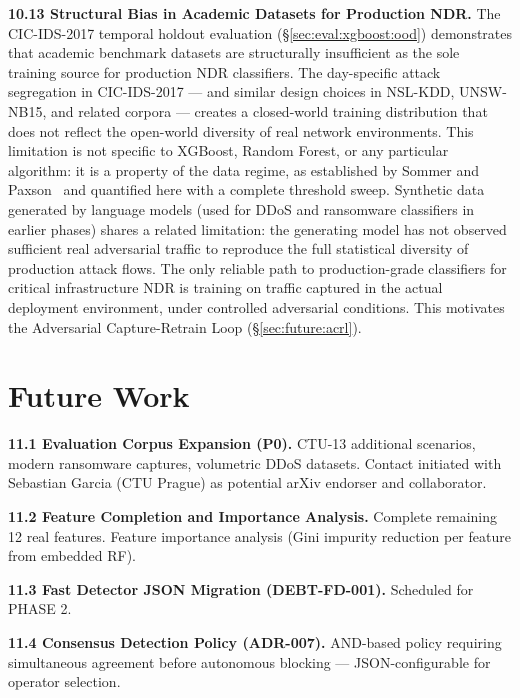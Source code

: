 \documentclass[11pt,a4paper]{article}
\begin{document}
    \textbf{10.13 Structural Bias in Academic Datasets for Production NDR.}
    The CIC-IDS-2017 temporal holdout evaluation (\S\ref{sec:eval:xgboost:ood}) demonstrates
    that academic benchmark datasets are structurally insufficient as the sole training source
    for production NDR classifiers. The day-specific attack segregation in CIC-IDS-2017 --- and
    similar design choices in NSL-KDD, UNSW-NB15, and related corpora --- creates a
    closed-world training distribution that does not reflect the open-world diversity of
    real network environments. This limitation is not specific to XGBoost, Random Forest,
    or any particular algorithm: it is a property of the data regime, as established by
    Sommer and Paxson~\cite{sommer2010} and quantified here with a complete threshold sweep.
    Synthetic data generated by language models (used for DDoS and ransomware classifiers
    in earlier phases) shares a related limitation: the generating model has not observed
    sufficient real adversarial traffic to reproduce the full statistical diversity of
    production attack flows.
    The only reliable path to production-grade classifiers for critical infrastructure
    NDR is training on traffic captured in the actual deployment environment, under
    controlled adversarial conditions. This motivates the Adversarial Capture-Retrain Loop
    (\S\ref{sec:future:acrl}).

    \section{Future Work}
    \label{sec:future}

    \textbf{11.1 Evaluation Corpus Expansion (P0).}
    \label{sec:future:corpus}
    CTU-13 additional scenarios, modern ransomware captures, volumetric DDoS datasets. Contact
    initiated with Sebastian Garcia (CTU Prague) as potential arXiv endorser and collaborator.

    \textbf{11.2 Feature Completion and Importance Analysis.}
    Complete remaining 12 real features. Feature importance analysis (Gini impurity reduction
    per feature from embedded RF).

    \textbf{11.3 Fast Detector JSON Migration (DEBT-FD-001).} Scheduled for PHASE 2.

    \textbf{11.4 Consensus Detection Policy (ADR-007).}
    \label{sec:future:consensus}
    AND-based policy requiring simultaneous agreement before autonomous blocking ---
    JSON-configurable for operator selection.
\end{document}
